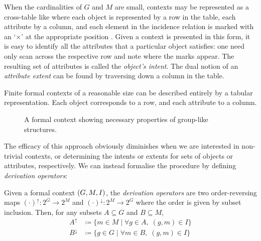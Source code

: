 When the cardinalities of $G$ and $M$ are small, contexts may be represented as a cross-table like  where each object is represented by a row in the table, each attribute by a column, and each element in the incidence relation is marked with an `$\times$' at the appropriate position \cite[pp. 17]{ganter1999formal}. Given a context is presented in this form, it is easy to identify all the attributes that a particular object satisfies: one need only scan across the respective row and note where the marks appear. The resulting set of attributes is called the \textit{object's intent}. The dual notion of an \textit{attribute extent} can be found by traversing down a column in the table. 
\begin{example}
  \label{example:first-example-formal-context}
  Finite formal contexts of a reasonable size can be described entirely by a tabular representation. Each object corresponds to a row, and each attribute to a column.

  \begin{figure}[H]
    \centering
    \begin{cxt}
          
    \end{cxt}
    \caption{A formal context showing necessary properties of group-like structures.}
    \label{context:formal-context-group-structures}
  \end{figure}
\end{example}

The efficacy of this approach obviously diminishes when we are interested in non-trivial contexts, or determining the intents or extents for sets of objects or attributes, respectively. We can instead formalise the procedure by defining \textit{derivation operators}:

\begin{definition}
     \label{definition:derivation-operators}  
  Given a formal context $(G,M,I)$, the \textit{derivation operators} are two order-reversing maps $(\cdot)^\uparrow : 2^G \to 2^M$ and $(\cdot)^\downarrow : 2^M \to 2^G$ where the order is given by subset inclusion. Then, for any subsets $A \subseteq G$ and $B \subseteq M$,
  \begin{align*}
       A^\uparrow & \coloneqq \{m \in M \mid \forall g \in A, \; (g,m) \in I\} \\
       B^\downarrow & \coloneqq \{g \in G \mid \forall m \in B, \; (g,m) \in I\}
  \end{align*}
\end{definition}

